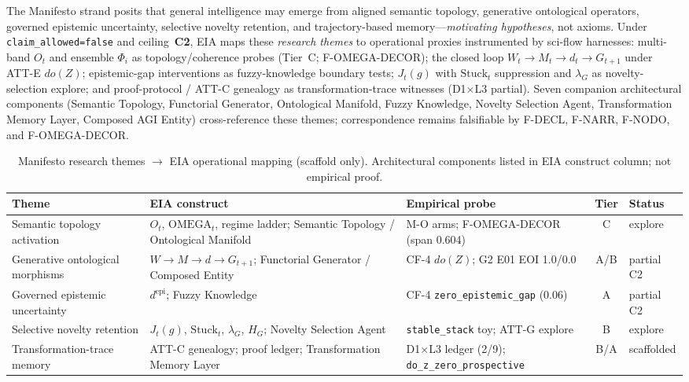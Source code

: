\documentclass[11pt,a4paper]{article}
\theoremstyle{definition}
\begin{document}
The Manifesto strand posits that general intelligence may emerge from aligned semantic topology, generative ontological operators, governed epistemic uncertainty, selective novelty retention, and trajectory-based memory---\emph{motivating hypotheses}, not axioms. Under \texttt{claim\_allowed=false} and ceiling~\textbf{C2}, EIA maps these \emph{research themes} to operational proxies instrumented by sci-flow harnesses: multi-band $O_t$ and ensemble $\Phi_i$ as topology/coherence probes (Tier~C; F-OMEGA-DECOR); the closed loop $W_t\!\to\!M_t\!\to\!d_t\!\to\!G_{t+1}$ under ATT-E $do(Z)$; epistemic-gap interventions as fuzzy-knowledge boundary tests; $J_t(g)$ with $\mathrm{Stuck}_t$ suppression and $\lambda_G$ as novelty-selection explore; and proof-protocol / ATT-C genealogy as transformation-trace witnesses (D1$\times$L3 partial). Seven companion architectural components (Semantic Topology, Functorial Generator, Ontological Manifold, Fuzzy Knowledge, Novelty Selection Agent, Transformation Memory Layer, Composed AGI Entity) cross-reference these themes; correspondence remains falsifiable by F-DECL, F-NARR, F-NODO, and F-OMEGA-DECOR.

\begin{table}[H]
\centering\scriptsize
\begin{tabular}{lp{2.5cm}p{2.8cm}cl}
\toprule Theme & EIA construct & Empirical probe & Tier & Status \\ \midrule
Semantic topology activation & $O_t$, $\mathrm{OMEGA}_t$, regime ladder; Semantic Topology / Ontological Manifold & M-O arms; F-OMEGA-DECOR (span 0.604) & C & explore \\
Generative ontological morphisms & $W\!\to\!M\!\to\!d\!\to\!G_{t+1}$; Functorial Generator / Composed Entity & CF-4 $do(Z)$; G2 E01 EOI 1.0/0.0 & A/B & partial C2 \\
Governed epistemic uncertainty & $d^{\mathrm{epi}}$; Fuzzy Knowledge & CF-4 \texttt{zero\_epistemic\_gap} (0.06) & A & partial C2 \\
Selective novelty retention & $J_t(g)$, $\mathrm{Stuck}_t$, $\lambda_G$, $H_G$; Novelty Selection Agent & \texttt{stable\_stack} toy; ATT-G explore & B & explore \\
Transformation-trace memory & ATT-C genealogy; proof ledger; Transformation Memory Layer & D1$\times$L3 ledger (2/9); \texttt{do\_z\_zero\_prospective} & B/A & scaffolded \\ \bottomrule
\end{tabular}
\caption{Manifesto research themes $\to$ EIA operational mapping (scaffold only). Architectural components listed in EIA construct column; not empirical proof.}
\label{tab:manifesto-mapping}
\end{table}
\end{document}
